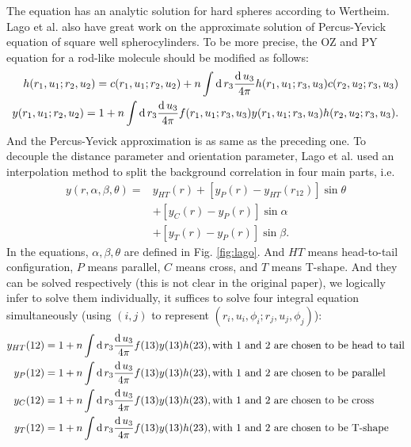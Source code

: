 The equation has an analytic solution for hard spheres according to Wertheim\cite{Wertheim1963HS}. Lago et al. also have great work\cite{Lago2003SQSC} on the approximate solution of Percus-Yevick equation of square well spherocylinders. To be more precise, the OZ and PY equation for a rod-like molecule should be modified as follows:
\begin{equation}
	\begin{split}
		h(r_1,u_1;r_2,u_2)=c(r_1,u_1;r_2,u_2)+n\int\operatorname{d}r_3\frac{\operatorname{d}u_3}{4\pi} h(r_1,u_1;r_3,u_3)c(r_2,u_2;r_3,u_3)\\
		y(r_1,u_1;r_2,u_2)=1+n\int\operatorname{d}r_3\frac{\operatorname{d}u_3}{4\pi}f(r_1,u_1;r_3,u_3)y(r_1,u_1;r_3,u_3)h(r_2,u_2;r_3,u_3).
	\end{split}
\end{equation}
And the Percus-Yevick approximation is as same as the preceding one. To decouple the distance parameter and orientation parameter, Lago et al. used an interpolation method to split the background correlation in four main parts, i.e.
\begin{equation}\label{Eqn:splitY}
	\begin{split}
	y\left(r, \alpha, \beta, \theta\right)=& y_{HT}\left(r\right)+\left[y_{P}\left(r\right)-y_{HT}\left(r_{12}\right)\right] \sin \theta \\
	&+\left[y_{C}\left(r\right)-y_{P}\left(r\right)\right] \sin \alpha \\
	&+\left[y_{T}\left(r\right)-y_{P}\left(r\right)\right] \sin \beta.
	\end{split}
\end{equation}
In the equations, $\alpha,\beta,\theta$ are defined in Fig. \ref{fig:lago}. And $HT$ means head-to-tail configuration, $P$ means parallel, $C$ means cross, and $T$ means T-shape. And they can be solved respectively (this is not clear in the original paper), we logically infer to solve them individually, it suffices to solve four integral equation simultaneously (using $(i,j)$ to represent $(r_i,u_i,\phi_i;r_j,u_j,\phi_j)$):
\begin{equation}
	\begin{split}
		y_{HT}(12)&=1+n\int\operatorname{d}r_3\frac{\operatorname{d}u_3}{4\pi}f(13)y(13)h(23), \text{with 1 and 2 are chosen to be head to tail} \\
		y_{P}(12)&=1+n\int\operatorname{d}r_3\frac{\operatorname{d}u_3}{4\pi}f(13)y(13)h(23), \text{with 1 and 2 are chosen to be parallel} \\
		y_{C}(12)&=1+n\int\operatorname{d}r_3\frac{\operatorname{d}u_3}{4\pi}f(13)y(13)h(23), \text{with 1 and 2 are chosen to be cross} \\
		y_{T}(12)&=1+n\int\operatorname{d}r_3\frac{\operatorname{d}u_3}{4\pi}f(13)y(13)h(23), \text{with 1 and 2 are chosen to be T-shape} 
	\end{split}
\end{equation}
